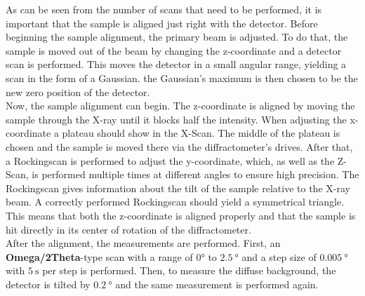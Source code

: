 As can be seen from the number of scans that need to be performed, it is important that the sample is aligned just right with the detector.
Before beginning the sample alignment, the primary beam is adjusted.
To do that, the sample is moved out of the beam by changing the z-coordinate and a detector scan is performed.
This moves the detector in a small angular range, yielding a scan in the form of a Gaussian.
the Gaussian's maximum is then chosen to be the new zero position of the detector. \\
Now, the sample alignment can begin.
The z-coordinate is aligned by moving the sample through the X-ray until it blocks half the intensity.
When adjusting the x-coordinate a plateau should show in the X-Scan.
The middle of the plateau is chosen and the sample is moved there via the diffractometer's drives.
After that, a Rockingscan is performed to adjust the y-coordinate, which, as well as the Z-Scan, is performed multiple times at
different angles to ensure high precision.
The Rockingscan gives information about the tilt of the sample relative to the X-ray beam.
A correctly performed Rockingscan should yield a symmetrical triangle.
This means that both the z-coordinate is aligned properly and that the sample is hit directly in its center of rotation of the diffractometer. \\

After the alignment, the measurements are performed.
First, an \textbf{Omega/2Theta}-type scan with a range of $0°$ to $\SI{2.5}{\degree}$ and a step size of $\SI{0.005}{\degree}$ with $\SI{5}{\second}$ per step is performed.
Then, to measure the diffuse background, the detector is tilted by $\SI{0.2}{\degree}$ and the same measurement is performed again.


